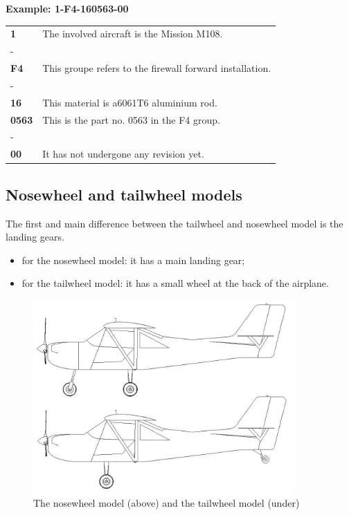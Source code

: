 \documentclass[11pt,a4paper]{article}
\begin{document}
\bigskip

\textbf{Example: 1-F4-160563-00} 

\bigskip

\begin{center}
\begin{tabular}{p{3cm} p{12cm}}
\textbf{1} & The involved aircraft is the Mission M108.  \tabularnewline
- \tabularnewline
\textbf{F4} & This groupe refers to the firewall forward installation. \tabularnewline
- \tabularnewline
\textbf{16} & This material is a6061T6 aluminium rod. \tabularnewline
\textbf{0563} & This is the part no. 0563 in the F4 group. \tabularnewline
- \tabularnewline
\textbf{00} & It has not undergone any revision yet. \tabularnewline
\end{tabular}
\end{center}

\newpage

\subsection{Nosewheel and tailwheel models}
\label{subsec:nosewheeltailwheel}

The first and main difference between the tailwheel and nosewheel model is the landing gears.

\begin{itemize}
\setlength{\itemsep}{0pt}
\item for the nosewheel model: it has a main landing gear;
\item for the tailwheel model: it has a small wheel at the back of the airplane.
\end{itemize}

\begin{figure}[ht!]
	\begin{center}
		\includegraphics[width=10cm]{pics/PIC018.jpg}
		\caption{The nosewheel model (above) and the tailwheel model (under)}
		\label{fig:PIC018}
	\end{center}
\end{figure}
\end{document}
